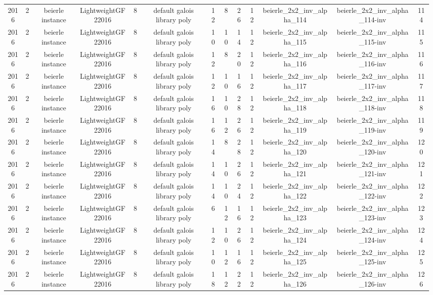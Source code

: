 \begin{tabular}{c c c c c c c c c c c c c}
2016 & 2 & beierle instance & LightweightGF22016 & 8 & default galois library poly & 12 & 8 & 26 & 12 & beierle_2x2_inv_alpha_114 & beierle_2x2_inv_alpha_114-inv & 114 \\
2016 & 2 & beierle instance & LightweightGF22016 & 8 & default galois library poly & 10 & 10 & 14 & 12 & beierle_2x2_inv_alpha_115 & beierle_2x2_inv_alpha_115-inv & 115 \\
2016 & 2 & beierle instance & LightweightGF22016 & 8 & default galois library poly & 12 & 8 & 20 & 12 & beierle_2x2_inv_alpha_116 & beierle_2x2_inv_alpha_116-inv & 116 \\
2016 & 2 & beierle instance & LightweightGF22016 & 8 & default galois library poly & 12 & 10 & 16 & 12 & beierle_2x2_inv_alpha_117 & beierle_2x2_inv_alpha_117-inv & 117 \\
2016 & 2 & beierle instance & LightweightGF22016 & 8 & default galois library poly & 16 & 10 & 28 & 12 & beierle_2x2_inv_alpha_118 & beierle_2x2_inv_alpha_118-inv & 118 \\
2016 & 2 & beierle instance & LightweightGF22016 & 8 & default galois library poly & 16 & 12 & 26 & 12 & beierle_2x2_inv_alpha_119 & beierle_2x2_inv_alpha_119-inv & 119 \\
2016 & 2 & beierle instance & LightweightGF22016 & 8 & default galois library poly & 14 & 8 & 28 & 12 & beierle_2x2_inv_alpha_120 & beierle_2x2_inv_alpha_120-inv & 120 \\
2016 & 2 & beierle instance & LightweightGF22016 & 8 & default galois library poly & 14 & 10 & 26 & 12 & beierle_2x2_inv_alpha_121 & beierle_2x2_inv_alpha_121-inv & 121 \\
2016 & 2 & beierle instance & LightweightGF22016 & 8 & default galois library poly & 14 & 10 & 24 & 12 & beierle_2x2_inv_alpha_122 & beierle_2x2_inv_alpha_122-inv & 122 \\
2016 & 2 & beierle instance & LightweightGF22016 & 8 & default galois library poly & 6 & 12 & 16 & 12 & beierle_2x2_inv_alpha_123 & beierle_2x2_inv_alpha_123-inv & 123 \\
2016 & 2 & beierle instance & LightweightGF22016 & 8 & default galois library poly & 12 & 10 & 26 & 12 & beierle_2x2_inv_alpha_124 & beierle_2x2_inv_alpha_124-inv & 124 \\
2016 & 2 & beierle instance & LightweightGF22016 & 8 & default galois library poly & 10 & 12 & 16 & 12 & beierle_2x2_inv_alpha_125 & beierle_2x2_inv_alpha_125-inv & 125 \\
2016 & 2 & beierle instance & LightweightGF22016 & 8 & default galois library poly & 18 & 12 & 22 & 12 & beierle_2x2_inv_alpha_126 & beierle_2x2_inv_alpha_126-inv & 126 \\

\end{tabular}
